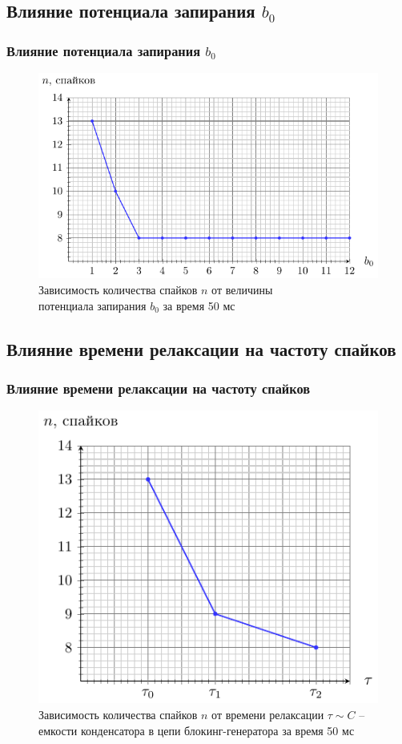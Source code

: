 \subsection{Влияние потенциала запирания $b_0$}
\begin{frame}%
	\frametitle{Влияние потенциала запирания $b_0$}
	\begin{figure}[h]
		\includegraphics[]{img/b0}
		\caption{Зависимость количества спайков $n$ от величины \\потенциала запирания $b_0$ за время 50 мс }
	\end{figure}
\end{frame}
\subsection{Влияние времени релаксации на частоту спайков}
\begin{frame}%
	\frametitle{Влияние времени релаксации на частоту спайков}
	\begin{figure}[h]
		\includegraphics[]{img/ntau2}
		\caption{Зависимость количества спайков $n$ от времени релаксации $\tau \sim C$ -- емкости конденсатора в цепи блокинг-генератора за время 50 мс }
	\end{figure}
\end{frame}

